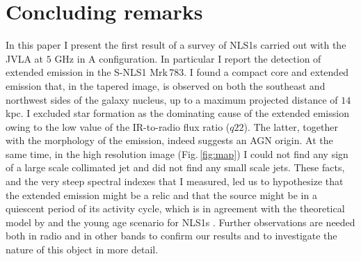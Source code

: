 \documentclass[../main.tex]{subfiles}
\begin{document}
\section{Concluding remarks}
\label{sec:summary}

In this paper I present the first result of a survey of NLS1s carried out with the JVLA at $5$ GHz in A configuration.
In particular I report the detection of extended emission in the S-NLS1 Mrk\,783.
I found a compact core and extended emission that, in the tapered image, is observed on both the southeast and northwest sides of the galaxy nucleus, up to a maximum projected distance of $14$ kpc.
I excluded star formation as the dominating cause of the extended emission owing to the low value of the IR-to-radio flux ratio ($q22$).
The latter, together with the morphology of the emission, indeed suggests an AGN origin.
At the same time, in the high resolution image (Fig.\,\ref{fig:map}) I could not find any sign of a large scale collimated jet and \citet{Doi13} did not find any small scale jets.
These facts, and the very steep spectral indexes that I measured, led us to hypothesize that the extended emission might be a relic and that the source might be in a quiescent period of its activity cycle, which is in agreement with the theoretical model by \citet{Czerny09} and the young age scenario for NLS1s \citep{Mathur00}. 
Further observations are needed both in radio and in other bands to confirm our results and to investigate the nature of this object  in more detail. 

\biblio
\end{document}
